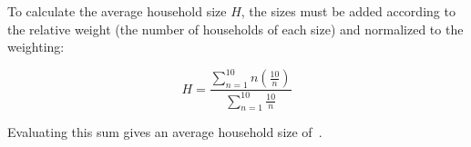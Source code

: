 \documentclass{article}
\begin{document}
To calculate the average household size $H$, the sizes must be added according to the relative weight (the number of households of each size) and normalized to the weighting:

\[
H=\frac{\displaystyle\sum_{n=1}^{10}n\left(\frac{10}{n}\right)}{\displaystyle\sum_{n=1}^{10}\frac{10}{n}}
\]

Evaluating this sum gives an average household size of
\,.
\end{document}
